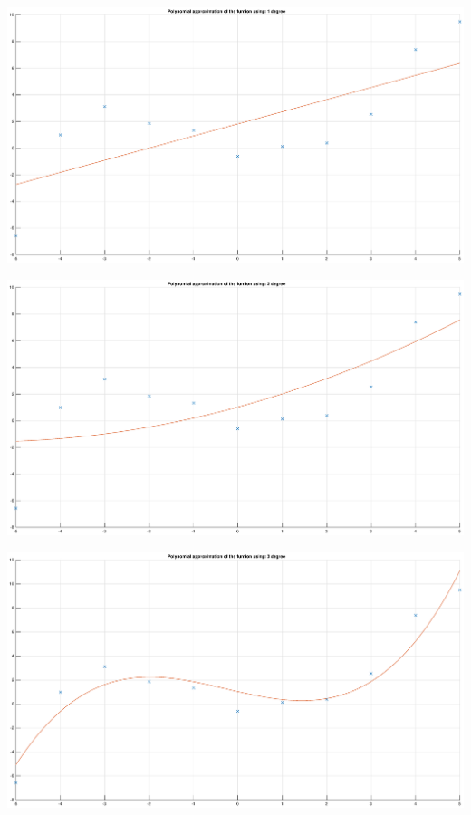 \documentclass[12pt]{report}
\begin{document}
\begin{center}
   \includegraphics[scale=0.25]{11.eps}
\end{center}

\begin{center}
   \includegraphics[scale=0.25]{12.eps}
\end{center}

\begin{center}
   \includegraphics[scale=0.25]{13.eps}
\end{center}
\end{document}
